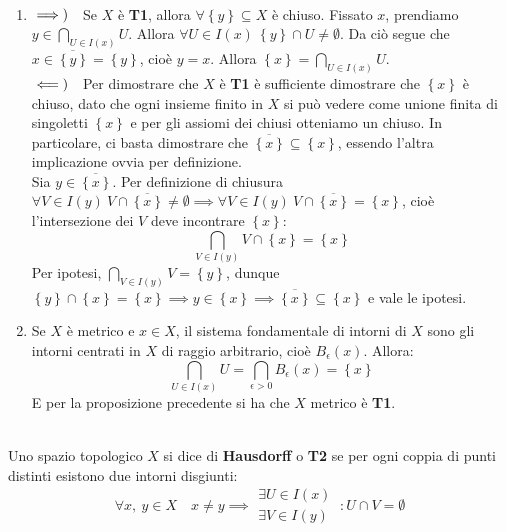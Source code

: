 \begin{demonstration}~{}
\begin{enumerate}[label=\Roman*]
\item $\implies)\quad$Se $X$ è \textbf{T1}, allora $\forall \left\{y\right\}\subseteq X$ è chiuso. Fissato $x$, prendiamo $\displaystyle y \in \bigcap_{U\in I\left(x\right)}U$. Allora $\forall U\in I\left(x\right)\ \left\{y\right\}\cap U\neq \emptyset$. Da ciò segue che $x\in\overline{\left\{y\right\}}=\left\{y\right\}$, cioè $y=x$. Allora $\displaystyle \left\{x\right\}=\bigcap_{U\in I\left(x\right)}U$.\\
$\impliedby)\quad$Per dimostrare che $X$ è \textbf{T1} è sufficiente dimostrare che $\left\{x\right\}$ è chiuso, dato che ogni insieme finito in $X$ si può vedere come unione finita di singoletti $\left\{x\right\}$ e per gli assiomi dei chiusi otteniamo un chiuso. In particolare, ci basta dimostrare che $\overline{\left\{x\right\}}\subseteq \left\{x\right\}$, essendo l'altra implicazione ovvia per definizione.\\
Sia $y\in\overline{\left\{x\right\}}$. Per definizione di chiusura $\forall V\in I\left(y\right)\ V\cap\overline{\left\{x\right\}}\neq\emptyset\implies \forall V\in I\left(y\right)\ V\cap\overline{\left\{x\right\}}=\left\{x\right\}$, cioè l'intersezione dei $V$ deve incontrare $\left\{x\right\}$:
\begin{equation*}
\bigcap_{V\in I\left(y\right)}V\cap\left\{x\right\}=\left\{x\right\}
\end{equation*}
Per ipotesi, $\displaystyle \bigcap_{V\in I\left(y\right)}V=\left\{y\right\}$, dunque $\left\{y\right\}\cap \left\{x\right\}=\left\{x\right\}\implies y\in\left\{x\right\}\implies\overline{\left\{x\right\}}\subseteq \left\{x\right\}$ e vale le ipotesi.
\item Se $X$ è metrico e $x\in X$, il sistema fondamentale di intorni di $X$ sono gli intorni centrati in $X$ di raggio arbitrario, cioè $B_{\epsilon}\left(x\right)$. Allora:
\begin{equation*}
\bigcap_{U\in I\left(x\right)}U=\bigcap_{\epsilon > 0}B_{\epsilon}\left(x\right)=\left\{x\right\}
\end{equation*}
E per la proposizione precedente si ha che $X$ metrico è \textbf{T1}.
\end{enumerate}
\end{demonstration}
\begin{define}~{}\\
Uno spazio topologico $X$ si dice di \textbf{Hausdorff} o \textbf{T2} se per ogni coppia di punti distinti esistono due intorni disgiunti:
\begin{equation}
	\forall x,\ y\in X\quad x\neq y\implies
	\begin{array}{l}
		\exists U\in I\left(x\right)\\
		\exists V\in I\left(y\right)
	\end{array}
\ \colon U\cap V=\emptyset
\end{equation}
\vspace{-6mm}
\end{define}
